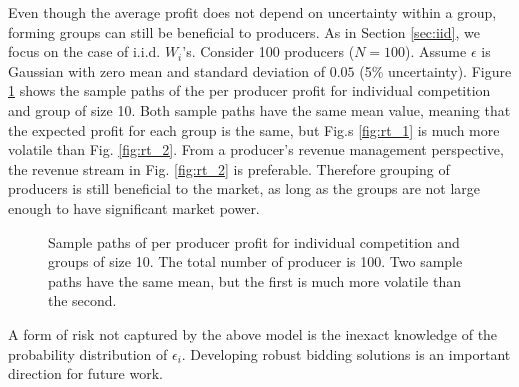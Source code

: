 \documentclass[journal]{IEEEtran}
\begin{document}
Even though the average profit does not depend on uncertainty within a group, forming groups can still be beneficial to producers. As in Section \ref{sec:iid}, we focus on the case of i.i.d. $W_i$'s. Consider 100 producers ($N=100$). Assume $\epsilon$ is Gaussian with zero mean and standard deviation of $0.05$ (5\% uncertainty).  Figure \ref{fig:rt_trace} shows the sample paths of the per producer profit for individual competition and group of size 10. Both sample paths have the same mean value, meaning that the expected profit for each group is the same, but Fig.s \ref{fig:rt_1} is much more volatile than Fig. \ref{fig:rt_2}. From a producer's revenue management perspective, the revenue stream in Fig. \ref{fig:rt_2} is preferable. Therefore grouping of producers is still beneficial to the market, as long as the groups are not large enough to have significant market power. 
\begin{figure}[!t]
\caption{Sample paths of per producer profit for individual competition and groups of size 10. The total number of producer is 100. Two sample paths have the same mean, but the first is much more volatile than the second. }
\label{fig:rt_trace}
\end{figure}

A form of risk not captured by the above model is the inexact knowledge of the probability distribution of $\epsilon_i$. Developing robust bidding solutions is an important direction for future work. 
  
\end{document}
